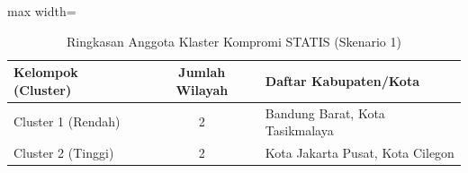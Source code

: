\begin{table}[H]
\centering
\caption{Ringkasan Anggota Klaster Kompromi STATIS (Skenario 1)} \label{tab:sample1compromclust}
\begin{adjustbox}{max width=\textwidth}
\begin{tabular}{|p{3cm}|c|p{10cm}|}
\hline
\textbf{Kelompok (Cluster)} & \textbf{Jumlah Wilayah} & \textbf{Daftar Kabupaten/Kota} \\
\hline
Cluster 1 (Rendah) & 2 & Bandung Barat, Kota Tasikmalaya \\
\hline
Cluster 2 (Tinggi) & 2 & Kota Jakarta Pusat, Kota Cilegon \\
\hline
\end{tabular}
\end{adjustbox}
\end{table}
